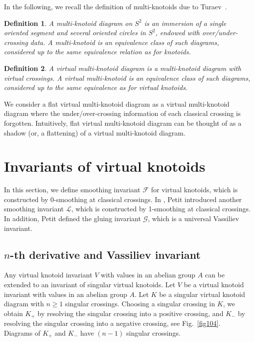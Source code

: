 \documentclass[11pt]{amsart}
\theoremstyle{noparens}
\newtheorem{definition}{Definition}[section]
\numberwithin{equation}{section}
\numberwithin{equation}{section}
\begin{document}
In the following, we recall the definition of multi-knotoids due to Turaev~\cite{Tur1}.

\begin{definition}
{\rm 
A \textit{multi-knotoid diagram} on $S^2$ is an immersion of a single oriented segment and several oriented circles in $S^2$, endowed with over/under-crossing data. A \textit{multi-knotoid} is an equivalence class of such diagrams, considered up to the same equivalence relation as for knotoids.
}
\end{definition}

\begin{definition} \label{def2.18}
{\rm 
A \textit{virtual multi-knotoid diagram} is a multi-knotoid diagram with virtual crossings. 
A \textit{virtual multi-knotoid} is an equivalence class of such diagrams, considered up to the same equivalence as for virtual knotoids. 
}
\end{definition}

We consider a flat virtual multi-knotoid diagram as a virtual multi-knotoid diagram where the under/over-crossing information of each classical crossing is forgotten. Intuitively, flat virtual multi-knotoid diagram can be thought of as a shadow (or, a flattening) of a virtual multi-knotoid diagram.

\section{Invariants of virtual knotoids} \label{section3}

In this section, we define smoothing invariant $\mathcal{F}$ for virtual knotoids, which is constructed by 0-smoothing at classical crossings.  In \cite{Pet}, Petit introduced another smoothing invariant $\mathcal{L}$, which is constructed by 1-smoothing at classical crossings. In addition, Petit defined the gluing invariant $\mathcal{G}$, which is a universal Vassiliev invariant. 

\subsection{$n$-th derivative and Vassiliev invariant} Any virtual knotoid invariant $V$ with values in an abelian group $A$ can be extended to an invariant of singular virtual knotoids. Let $V$ be a virtual knotoid invariant with values in an abelian group $A$. 
Let $K$ be a singular virtual knotoid diagram with $n \geq 1$ singular crossings. Choosing a singular crossing in $K$, we obtain $K_+$ by resolving the singular crossing into a positive crossing, and $K_-$ by resolving the singular crossing into a negative crossing, see Fig.~\ref{fig104}. Diagrams of $K_+$ and $K_-$ have $(n-1)$ singular crossings.
\end{document}
